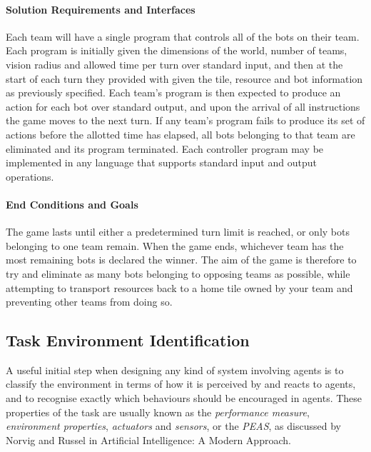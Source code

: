 \documentclass[a4paper,10pt]{article}
\begin{document}
\paragraph{Solution Requirements and Interfaces}
Each team will have a single program that controls all of the bots on their team. Each program is initially given the dimensions of the world, number of teams, vision radius and allowed time per turn over standard input, and then at the start of each turn they provided with given the tile, resource and bot information as previously specified. Each team's program is then expected to produce an action for each bot over standard output, and upon the arrival of all instructions the game moves to the next turn. If any team's program fails to produce its set of actions before the allotted time has elapsed, all bots belonging to that team are eliminated and its program terminated. Each controller program may be implemented in any language that supports standard input and output operations.

\paragraph{End Conditions and Goals}
The game lasts until either a predetermined turn limit is reached, or only bots belonging to one team remain. When the game ends, whichever team has the most remaining bots is declared the winner. The aim of the game is therefore to try and eliminate as many bots belonging to opposing teams as possible, while attempting to transport resources back to a home tile owned by your team and preventing other teams from doing so.

\subsection{Task Environment Identification}
A useful initial step when designing any kind of system involving agents is to classify the environment in terms of how it is perceived by and reacts to agents, and to recognise exactly which behaviours should be encouraged in agents. These properties of the task are usually known as the \emph{performance measure}, \emph{environment properties}, \emph{actuators} and \emph{sensors}, or the \emph{PEAS}, as discussed by Norvig and Russel in Artificial Intelligence: A Modern Approach\cite{norvig10}.
\end{document}

